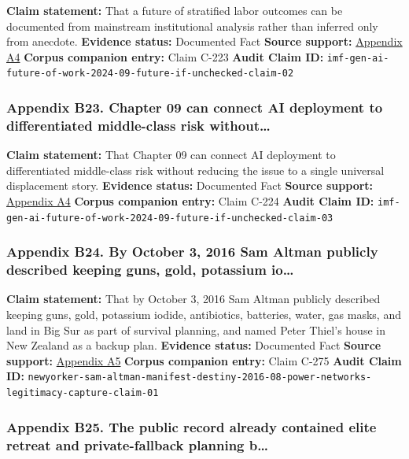 \documentclass[
  american,
  11pt,
  letterpaper,
]{article}
\begin{document}
\textbf{Claim statement:} That a future of stratified labor outcomes can
be documented from mainstream institutional analysis rather than
inferred only from anecdote. \textbf{Evidence status:} Documented Fact
\textbf{Source support:}
\hyperref[ch-09-appendix-a4-gen-ai-artificial-intelligence-and-the-future-of-work]{Appendix
A4} \textbf{Corpus companion entry:} Claim C-223 \textbf{Audit Claim
ID:}
\texttt{imf-gen-ai-future-of-work-2024-09-future-if-unchecked-claim-02}

\subsubsection{Appendix B23. Chapter 09 can connect AI deployment to
differentiated middle-class risk
without\ldots{}}\label{ch-09-appendix-b23-chapter-09-can-connect-ai-deployment-to-differentiated-middle-class-risk-without}

\textbf{Claim statement:} That Chapter 09 can connect AI deployment to
differentiated middle-class risk without reducing the issue to a single
universal displacement story. \textbf{Evidence status:} Documented Fact
\textbf{Source support:}
\hyperref[ch-09-appendix-a4-gen-ai-artificial-intelligence-and-the-future-of-work]{Appendix
A4} \textbf{Corpus companion entry:} Claim C-224 \textbf{Audit Claim
ID:}
\texttt{imf-gen-ai-future-of-work-2024-09-future-if-unchecked-claim-03}

\subsubsection{Appendix B24. By October 3, 2016 Sam Altman publicly
described keeping guns, gold, potassium
io\ldots{}}\label{ch-09-appendix-b24-by-october-3-2016-sam-altman-publicly-described-keeping-guns-gold-potassium-io}

\textbf{Claim statement:} That by October 3, 2016 Sam Altman publicly
described keeping guns, gold, potassium iodide, antibiotics, batteries,
water, gas masks, and land in Big Sur as part of survival planning, and
named Peter Thiel's house in New Zealand as a backup plan.
\textbf{Evidence status:} Documented Fact \textbf{Source support:}
\hyperref[ch-09-appendix-a5-sam-altman-s-manifest-destiny]{Appendix A5}
\textbf{Corpus companion entry:} Claim C-275 \textbf{Audit Claim ID:}
\texttt{newyorker-sam-altman-manifest-destiny-2016-08-power-networks-legitimacy-capture-claim-01}

\subsubsection{Appendix B25. The public record already contained elite
retreat and private-fallback planning
b\ldots{}}\label{ch-09-appendix-b25-the-public-record-already-contained-elite-retreat-and-private-fallback-planning-b}
\end{document}

